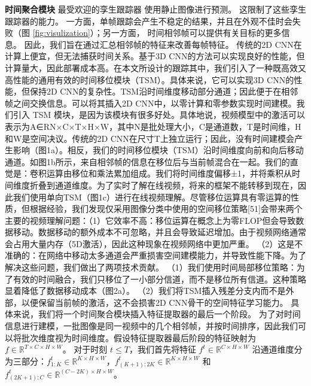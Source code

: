\textbf{时间聚合模块}
最受欢迎的孪生跟踪器 \cite{SiamRPN++, Wang2018SiamMask} 使用静止图像进行预测。%
这限制了这些孪生跟踪器的能力。
一方面，单帧跟踪会产生不稳定的结果，并且在外观不佳时会失败（图 \ref{fig:visulization}）；另一方面，
时间相邻帧可以提供有关目标的更多信息。
因此，我们旨在通过汇总相邻帧的特征来改善每帧特征。
传统的2D CNN在计算上便宜，但无法捕获时间关系。基于3D CNN的方法可以实现良好的性能，但计算量大，因此部署成本高。在本文所设计的跟踪其中，我们引入了一种既高效又高性能的通用有效的时间移位模块（TSM）。具体来说，它可以实现3D CNN的性能，但保持2D CNN的复杂性。TSM沿时间维度移动部分通道；因此便于在相邻帧之间交换信息。可以将其插入2D CNN中，以零计算和零参数实现时间建模。我们引入 TSM 模块，是因为该模块有很多好处。具体地说，视频模型中的激活可以表示为A∈RN×C×T×H×W，其中N是批处理大小，C是通道数，T是时间维，H和W是空间决议。传统的2D CNN在尺寸T上独立运行；因此，没有时间建模会产生影响（图1a）。相反，我们的时间移位模块（TSM）沿时间维度向前和向后移动通道。如图1b所示，来自相邻帧的信息在移位后与当前帧混合在一起。我们的直觉是：卷积运算由移位和乘法累加组成。我们将时间维度偏移±1，并将乘积从时间维度折叠到通道维度。为了实时了解在线视频，将来的框架不能转移到现在，因此我们使用单向TSM（图1c）进行在线视频理解。尽管移位运算具有零运算的性质，但根据经验，我们发现仅采用图像分类中使用的空间移位策略[51]会带来两个主要的视频理解问题：（1）它效率不高：移位运算在概念上为零FLOP但会导致数据移动。数据移动的额外成本不可忽略，并且会导致延迟增加。由于视频网络通常会占用大量内存（5D激活），因此这种现象在视频网络中更加严重。 （2）这是不准确的：在网络中移动太多通道会严重损害空间建模能力，并导致性能下降。为了解决这些问题，我们做出了两项技术贡献。 （1）我们使用时间局部移位策略：为了有效的时间融合，我们只移位了一小部分信道，而不是移位所有信道。这种策略显着降低了数据移动成本（图2a）。 （2）我们将TSM插入残差分支内而不是外部，以便保留当前帧的激活，这不会损害2D CNN骨干的空间特征学习能力。%
具体来说，我们将一个时间聚合模块插入特征提取器的最后一个阶段。
为了对时间信息进行建模，一批图像是同一视频中的几个相邻帧，并按时间排序，因此我们可以将批次维度视为时间维度。假设特征提取器最后阶段的特征映射为 $f \in \mathbb R ^ {T \times C \times H \times W}$。
对于时刻 $t \leq T$，我们首先将特征 $f^t \in \mathbb R ^ {C \times H \times W}$ 沿通道维度分为三部分：$f_{1:K}^t \in \mathbb R ^ {K \times H \times W}$，$f_{(K+1):2K}^t \in \mathbb R ^ {K \times H \times W}$ 和 $f_{(2K+1):C}^t \in \mathbb R ^ {(C-2K) \times H \times W}$。
